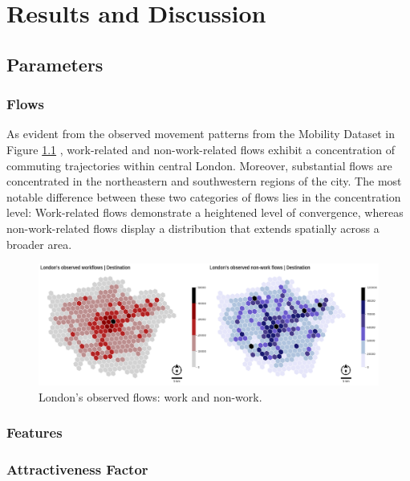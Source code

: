 \chapter{Results and Discussion}
\label{chapterlabel4}
    \section{Parameters}
        \subsection{Flows}

        As evident from the observed movement patterns from the Mobility Dataset in Figure \ref{fig: observedflows_overview} , work-related and non-work-related flows exhibit a concentration of commuting trajectories within central London. Moreover, substantial flows are concentrated in the northeastern and southwestern regions of the city. The most notable difference between these two categories of flows lies in the concentration level: Work-related flows demonstrate a heightened level of convergence, whereas non-work-related flows display a distribution that extends spatially across a broader area.

    \begin{figure}[H]
        \centering
        \includegraphics[width=15cm]{Images/Hex_observed_overview.png}
        \caption{London's observed flows: work and non-work.}
        \label{fig: observedflows_overview}
    \end{figure}

        \subsection{Features}


        

        \subsection{Attractiveness Factor}
        
